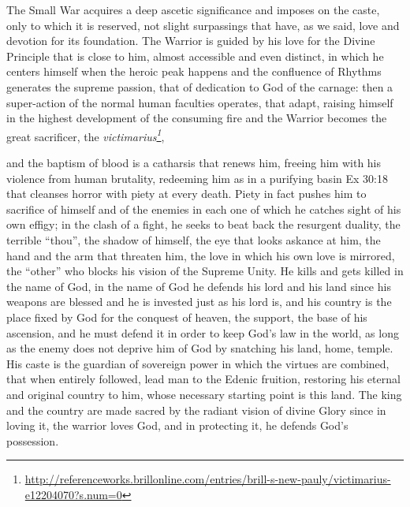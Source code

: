The Small War acquires a deep ascetic significance and imposes on the caste, only to which it is reserved, not slight surpassings that have, as we said, love and devotion for its foundation. The Warrior is guided by his love for the Divine Principle that is close to him, almost accessible and even distinct, in which he centers himself when the heroic peak happens and the confluence of Rhythms generates the supreme passion, that of dedication to God of the carnage: then a super-action of the normal human faculties operates, that adapt, raising himself in the highest development of the consuming fire and the Warrior becomes the great sacrificer, the
\emph{victimarius\footnote{\url{http://referenceworks.brillonline.com/entries/brill-s-new-pauly/victimarius-e12204070?s.num=0}}},

and the baptism of blood is a catharsis that renews him, freeing him with his violence from human brutality, redeeming him as in a purifying basin Ex 30:18 that cleanses horror with piety at every death. Piety in fact pushes him to sacrifice of himself and of the enemies in each one of which he catches sight of his own effigy; in the clash of a fight, he seeks to beat back the resurgent duality, the terrible ``thou'', the shadow of himself, the eye that looks askance at him, the hand and the arm that threaten him, the love in which his own love is mirrored, the ``other'' who blocks his vision of the Supreme Unity. He kills and gets killed in the name of God, in the name of God he defends his lord and his land since his weapons are blessed and he is invested just as his lord is, and his country is the place fixed by God for the conquest of heaven, the support, the base of his ascension, and he must defend it in order to keep God's law in the world, as long as the enemy does not deprive him of God by snatching his land, home, temple. His caste is the guardian of sovereign power in which the virtues are combined, that when entirely followed, lead man to the Edenic fruition, restoring his eternal and original country to him, whose necessary starting point is this land. The king and the country are made sacred by the radiant vision of divine Glory since in loving it, the warrior loves God, and in protecting it, he defends God's possession.

